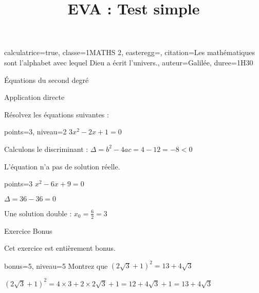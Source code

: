 \documentclass[correctionfin,theme=vert]{nfdevoirs}
\title{EVA : Test simple}
\begin{document}
\begin{devoir}{
  calculatrice=true,
  classe={1MATHS 2},
  easteregg={},
  citation={Les mathématiques sont l'alphabet avec lequel Dieu a écrit l'univers.},
  auteur={Galilée},
  duree={1H30}
}

\begin{partie}{Équations du second degré}
  
  \begin{exercice}{Application directe}
    
    Résolvez les équations suivantes :
    
    \begin{question}{points=3, niveau=2}
      $3x^2 - 2x + 1 = 0$
    \end{question}
    
    \begin{correction}
      Calculons le discriminant : $\Delta = b^2 - 4ac = 4 - 12 = -8 < 0$
      
      L'équation n'a pas de solution réelle.
    \end{correction}
    
    \begin{question}{points=3}
      $x^2 - 6x + 9 = 0$
    \end{question}
    
    \begin{correction}
      $\Delta = 36 - 36 = 0$
      
      Une solution double : $x_0 = \frac{6}{2} = 3$
    \end{correction}
    
  \end{exercice}
  
  \begin{exercice}{Exercice Bonus}
    
    Cet exercice est entièrement bonus.
    
    \begin{question}{bonus=5, niveau=5}
      Montrez que $(2\sqrt{3} + 1)^2 = 13 + 4\sqrt{3}$
    \end{question}
    
    \begin{correction}
      $(2\sqrt{3} + 1)^2 = 4 \times 3 + 2 \times 2\sqrt{3} + 1 = 12 + 4\sqrt{3} + 1 = 13 + 4\sqrt{3}$
    \end{correction}
    
  \end{exercice}
  
\end{partie}

\end{devoir}
\end{document}
